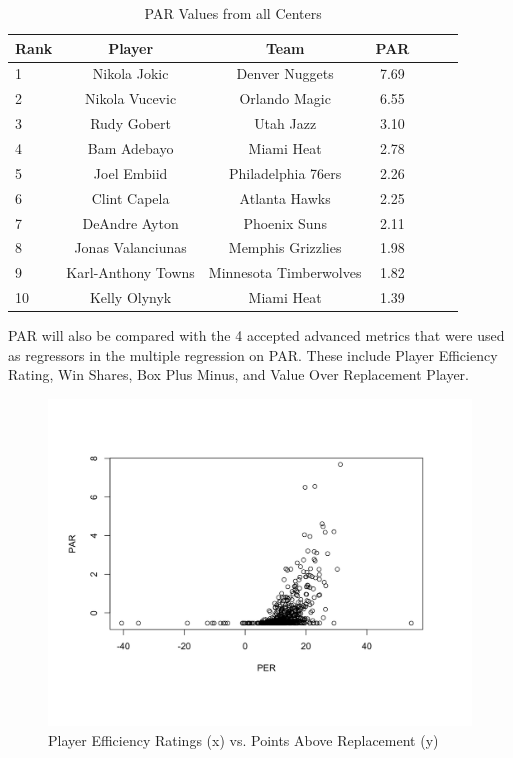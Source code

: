\documentclass[12pt]{article}
\begin{document}
\begin{table}[H]
  \caption{PAR Values from all Centers}
  \label{tab:Ctable}
\centering
\begin{tabular}[t]{lcccccc}
  \toprule
  Rank & Player & Team & PAR\\
  \midrule
 1 & Nikola Jokic & Denver Nuggets & 7.69\\
 2 & Nikola Vucevic & Orlando Magic & 6.55\\
 3 & Rudy Gobert & Utah Jazz & 3.10\\
 4 & Bam Adebayo & Miami Heat & 2.78\\
 5 & Joel Embiid & Philadelphia 76ers & 2.26\\
 6 & Clint Capela & Atlanta Hawks & 2.25\\
 7 & DeAndre Ayton & Phoenix Suns & 2.11\\
 8 & Jonas Valanciunas & Memphis Grizzlies & 1.98\\
 9 & Karl-Anthony Towns & Minnesota Timberwolves & 1.82\\
 10 & Kelly Olynyk & Miami Heat & 1.39\\
  \bottomrule
\end{tabular}
\end{table}

PAR will also be compared with the 4 accepted advanced metrics that 
were used as regressors in the 
multiple regression on PAR. These include Player Efficiency Rating, Win 
Shares, Box Plus Minus, and 
Value Over Replacement Player.

\begin{figure}[H]
  \centering
  \includegraphics[width=\textwidth]{PERvsPAR}
  \caption{Player Efficiency Ratings (x) vs. Points Above Replacement (y)}
  \label{fig:Fig1}
\end{figure}
\end{document}

